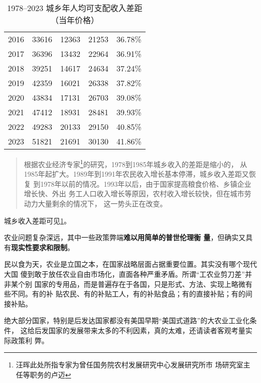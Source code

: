 \begin{table}[htbp]
\begin{minipage}{0.47\textwidth}
{\begin{tabular}{ccccc}
        2016       & 33616       & 12363       & 21253         & 36.78\%        \\
        2017       & 36396       & 13432       & 22964         & 36.91\%        \\
        2018       & 39251       & 14617       & 24634         & 37.24\%        \\
        2019       & 42359       & 16021       & 26338         & 37.82\%        \\
        2020       & 43834       & 17131       & 26703         & 39.08\%        \\
        2021       & 47412       & 18931       & 28481         & 39.93\%        \\
        2022       & 49283       & 20133       & 29150         & 40.85\%        \\
        2023       & 51821       & 21691       & 30130         & 41.86\%        \\ \bottomrule
      \end{tabular}%
    }
  \end{minipage}

  \caption{1978--2023 城乡年人均可支配收入差距（当年价格）}
  \label{tab:chengxiangcha}

  \StopDefiningTabulars
\end{table}


\begin{quotation}
  根据农业经济专家\footnote{汪晖此处所指专家为曾任国务院农村发展研究中心发展研究所市
    场研究室主任等职务的卢迈}的研究，1978到1985年城乡收入的差距是缩小的，
  从1985年起扩大。1989年到1991年农民收入增长基本停滞，城乡收入差距又恢复
  到1978年以前的情况。1993年以后，由于国家提高粮食价格、乡镇企业增长快、外出
  务工人口收入增长等原因，农村收入增长较快，但在城市劳动力大量剩余的情况下，
  这一势头正在改变。\cite{wangxiandai}
\end{quotation}
城乡收入差距可见\cref{tab:chengxiangcha}。


农业问题复杂深远，其中一些政策弊端\textbf{难以用简单的普世伦理衡
  量}，但确实又具有\textbf{现实性要求和限制}。

民以食为天，农业是立国之本，在国家战略层面占据重要位置。其实没有哪个现代大国
傻到敢于放任农业自由市场化，直面各种严重矛盾。所谓“工农业剪刀差”并非某个别
国家的专用品，而是普遍存在于各国，只是形式、方法、实现上略微有些不同。有的补
贴农民、有的补贴工人，有的补贴食品；有的直接补贴；有的间接补贴。

绝大部分国家，特别是后发达国家都没有美国早期“美国式道路”的大农业工业化条件，
这给后发国家的发展带来太多的不利因素，真的太难，还请读者客观考量实际政策利
弊。

